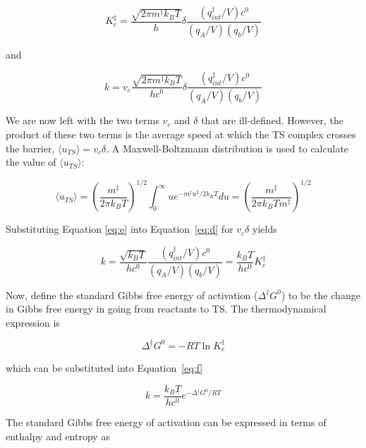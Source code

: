 \begin{equation}
  K_c^{\ddagger} =  \frac{\sqrt{2\pi m^\ddagger k_B T}}{h}\delta\frac{(q_{int}^\ddagger/V)c^0}{(q_A/V)(q_b/V)}
\end{equation}

\noindent and

\begin{equation}
 k = v_c \frac{\sqrt{2\pi m^\ddagger
     k_B T}}{hc^0}\delta\frac{(q_{int}^\ddagger/V)c^0}{(q_A/V)(q_b/V)}
\label{eq:d}
\end{equation}

We are now left with the two terms $v_c$ and $\delta$ that are ill-defined.
However, the product of these two terms is the average speed at which the TS
complex crosses the barrier, $\langle u_{TS} \rangle = v_c\delta$. A
Maxwell-Boltzmann distribution is used to calculate the value of $\langle
u_{TS} \rangle$:

\begin{equation}
  \langle u_{TS} \rangle = \left( \frac{m^\ddagger}{2\pi k_B T} \right)^{1/2}
  \int_0^\infty u e^{-m^\ddagger u^2/2k_B T}du = \left( \frac{m^\ddagger}{2\pi
      k_B T m^\ddagger} \right)^{1/2}
\label{eq:e}
\end{equation}

\noindent Substituting Equation \ref{eq:e} into Equation~\ref{eq:d} for
$v_c\delta$ yields

\begin{equation}
  k =
  \frac{\sqrt{k_B T}}{hc^0}\frac{(q_{int}^\ddagger/V)c^0}{(q_A/V)(q_b/V)} = \frac{k_B T}{hc^0}K_c^\ddagger
\label{eq:f}
\end{equation}

Now, define the standard Gibbs free energy of activation ($\Delta ^\ddagger
G^0$) to be the change in Gibbs free energy in going from reactants to TS.\@
The thermodynamical expression is

\begin{equation}
  \Delta ^\ddagger G^0 = -RT \ln K_c^\ddagger
\end{equation}

\noindent which can be substituted into Equation~\ref{eq:f}

\begin{equation}
  k = \frac{k_B T}{hc^0} e^{-\Delta^\ddagger G^0/RT}
\label{eq:g}
\end{equation}

The standard Gibbs free energy of activation can be expressed in terms of
enthalpy and entropy as

